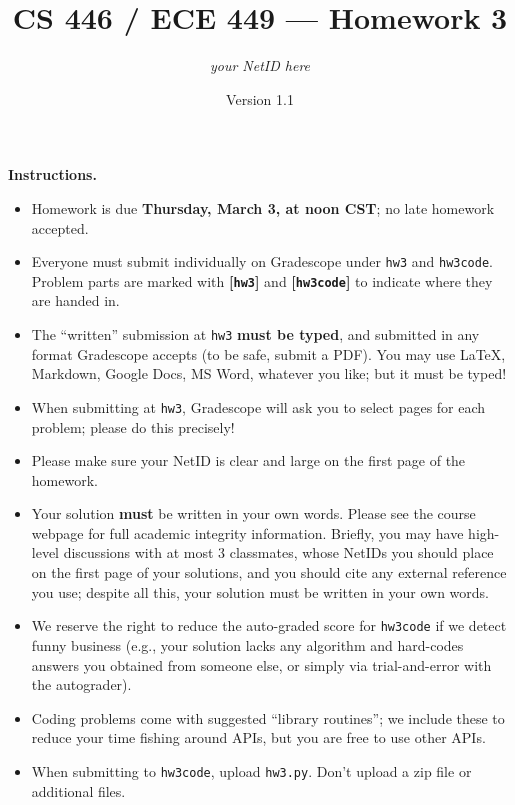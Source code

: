 \documentclass{article}
\title{CS 446 / ECE 449 --- Homework 3}
\author{\emph{your NetID here}}
\date{Version 1.1}
\def\hw{\textbf{[\texttt{hw3}]}\xspace}
\def\hwcode{\textbf{[\texttt{hw3code}]}\xspace}
\theoremstyle{definition}
\theoremstyle{remark}
\begin{document}
\maketitle

\noindent\textbf{Instructions.}
\begin{itemize}
  \item
    Homework is due \textbf{Thursday, March 3, at noon CST}; no late homework accepted.

  \item
    Everyone must submit individually on Gradescope under \texttt{hw3} and \texttt{hw3code}.
    Problem parts are marked with \hw and \hwcode to indicate where they are handed in.

  \item
    The ``written'' submission at \texttt{hw3} \textbf{must be typed}, and submitted in
    any format Gradescope accepts (to be safe, submit a PDF).  You may use \LaTeX, Markdown,
    Google Docs, MS Word, whatever you like; but it must be typed!

  \item
    When submitting at \texttt{hw3}, Gradescope will ask you to select pages
    for each problem; please do this precisely!

  \item
    Please make sure your NetID is clear and large on the first page of the homework.

  \item
    Your solution \textbf{must} be written in your own words.
    Please see the course webpage for full academic integrity information.
    Briefly, you may have high-level discussions with at most 3 classmates,
    whose NetIDs you should place on the first page of your solutions,
    and you should cite any external reference you use; despite all this,
    your solution must be written in your own words.

  \item
    We reserve the right to reduce the auto-graded score for
    \texttt{hw3code} if we detect funny business (e.g., your solution
    lacks any algorithm and hard-codes answers you obtained from
    someone else, or simply via trial-and-error with the autograder).

  \item
    Coding problems come with suggested ``library routines''; we include these to reduce
    your time fishing around APIs, but you are free to use other APIs.

    
  \item
    When submitting to \texttt{hw3code}, upload \texttt{hw3.py}. Don’t upload a zip file or additional files.
\end{itemize}
\end{document}
